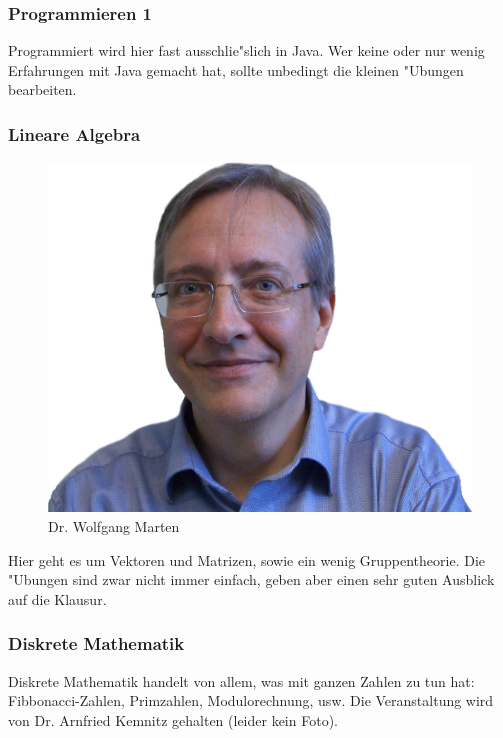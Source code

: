 \subsubsection{Programmieren 1}

Programmiert wird hier fast ausschlie"slich in Java. Wer keine oder nur wenig Erfahrungen mit Java gemacht hat, sollte unbedingt die kleinen "Ubungen bearbeiten.

\subsubsection{Lineare Algebra}

\begin{figure}[h]
	\centering\includegraphics[width=0.8\linewidth]{bilder/dozenten/marten_frei.png}\\
	{Dr. Wolfgang Marten}
\end{figure}
Hier geht es um Vektoren und Matrizen, sowie ein wenig Gruppentheorie.
Die "Ubungen sind zwar nicht immer einfach, geben aber einen sehr guten Ausblick auf die Klausur.

\subsubsection{Diskrete Mathematik}

Diskrete Mathematik handelt von allem, was mit ganzen Zahlen zu tun hat: Fibbonacci-Zahlen, Primzahlen, Modulorechnung, usw.
Die Veranstaltung wird von Dr. Arnfried Kemnitz gehalten (leider kein Foto).

